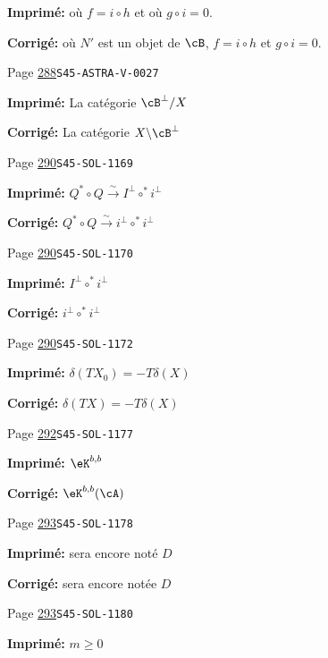 \documentclass[oneside]{book}
\newcommand{\iso}{\xrightarrow\sim}
\theoremstyle{sga-source}
\theoremstyle{sga-source-dash}
\theoremstyle{sga-source-dotdash}
\theoremstyle{sga-source-number-note-dash}
\theoremstyle{sga-source-note-number-dotdash}
\theoremstyle{sga-source-example-dotdash}
\theoremstyle{sga-source-inline-number}
\theoremstyle{sga-source-bare-number}
\theoremstyle{sga-source}
\begin{document}
\begin{description}
\par\noindent\textbf{Imprimé:} où $f=i\circ h$ et où $g\circ i=0$.
\par\noindent\textbf{Corrigé:} où $N'$ est un objet de $\cB$, $f=i\circ h$ et $g\circ i=0$.
\smallskip
\item[\hypertarget{apparatus:FR-0290}{290}] Page \hyperlink{printpage:fr:288}{288}\quad\texttt{S45-ASTRA-V-0027}
\par\noindent\textbf{Imprimé:} La catégorie $\cB^\bot/X$
\par\noindent\textbf{Corrigé:} La catégorie $X\backslash\cB^\bot$
\smallskip
\item[\hypertarget{apparatus:FR-0291}{291}] Page \hyperlink{printpage:fr:290}{290}\quad\texttt{S45-SOL-1169}
\par\noindent\textbf{Imprimé:} \(Q^\ast\circ Q\iso I^\bot\circ ^\ast i^\bot\)
\par\noindent\textbf{Corrigé:} \(Q^\ast\circ Q\iso i^\bot\circ ^\ast i^\bot\)
\smallskip
\item[\hypertarget{apparatus:FR-0292}{292}] Page \hyperlink{printpage:fr:290}{290}\quad\texttt{S45-SOL-1170}
\par\noindent\textbf{Imprimé:} \(I^\bot\circ ^\ast i^\bot\)
\par\noindent\textbf{Corrigé:} \(i^\bot\circ ^\ast i^\bot\)
\smallskip
\item[\hypertarget{apparatus:FR-0293}{293}] Page \hyperlink{printpage:fr:290}{290}\quad\texttt{S45-SOL-1172}
\par\noindent\textbf{Imprimé:} \(\delta(T X_0) = - T \delta(X)\)
\par\noindent\textbf{Corrigé:} \(\delta(T X) = - T \delta(X)\)
\smallskip
\item[\hypertarget{apparatus:FR-0294}{294}] Page \hyperlink{printpage:fr:292}{292}\quad\texttt{S45-SOL-1177}
\par\noindent\textbf{Imprimé:} \(\eK^{b,b}\)
\par\noindent\textbf{Corrigé:} \(\eK^{b,b}(\cA)\)
\smallskip
\item[\hypertarget{apparatus:FR-0295}{295}] Page \hyperlink{printpage:fr:293}{293}\quad\texttt{S45-SOL-1178}
\par\noindent\textbf{Imprimé:} sera encore noté $D$
\par\noindent\textbf{Corrigé:} sera encore notée $D$
\smallskip
\item[\hypertarget{apparatus:FR-0296}{296}] Page \hyperlink{printpage:fr:293}{293}\quad\texttt{S45-SOL-1180}
\par\noindent\textbf{Imprimé:} $m\geqslant 0$

\end{description}
\end{document}
